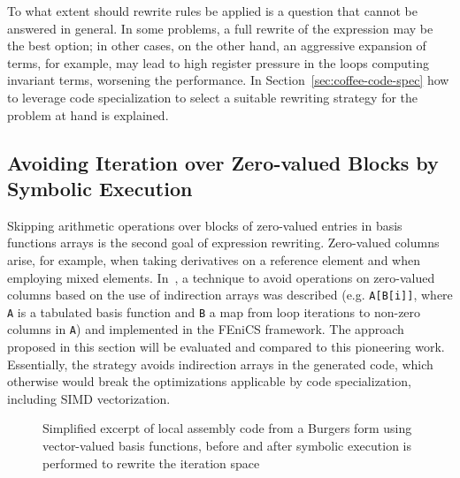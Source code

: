 To what extent should rewrite rules be applied is a question that cannot be answered in general. In some problems, a full rewrite of the expression may be the best option; in other cases, on the other hand, an aggressive expansion of terms, for example, may lead to high register pressure in the loops computing invariant terms, worsening the performance. In Section~\ref{sec:coffee-code-spec} how to leverage code specialization to select a suitable rewriting strategy for the problem at hand is explained.

\subsection{Avoiding Iteration over Zero-valued Blocks by Symbolic Execution}
\label{sec:coffee-avoidzeros}
Skipping arithmetic operations over blocks of zero-valued entries in basis functions arrays is the second goal of expression rewriting. Zero-valued columns arise, for example, when taking derivatives on a reference element and when employing mixed elements. In~\cite{quadrature-olegaard}, a technique to avoid operations on zero-valued columns based on the use of indirection arrays was described (e.g. \texttt{A[B[i]]}, where \texttt{A} is a tabulated basis function and \texttt{B} a map from loop iterations to non-zero columns in \texttt{A}) and implemented in the FEniCS framework. The approach proposed in this section will be evaluated and compared to this pioneering work. Essentially, the strategy avoids indirection arrays in the generated code, which otherwise would break the optimizations applicable by code specialization, including SIMD vectorization. 

\begin{figure}[t]
\tiny
\centering     
{}
\caption{Simplified excerpt of local assembly code from a Burgers form using vector-valued basis functions, before and after symbolic execution is performed to rewrite the iteration space}\label{fig:skip-code}
\end{figure}

